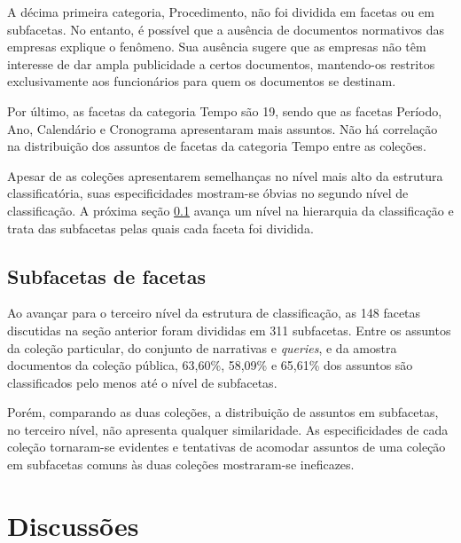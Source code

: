 A décima primeira categoria, Procedimento, não foi dividida em facetas ou em subfacetas. No entanto, é possível que a ausência de documentos normativos das empresas explique o fenômeno. Sua ausência sugere que as empresas não têm interesse de dar ampla publicidade a certos documentos, mantendo-os restritos exclusivamente aos funcionários para quem os documentos se destinam.

Por último, as facetas da categoria Tempo são 19, sendo que as facetas Período, Ano, Calendário e Cronograma apresentaram mais assuntos. Não há correlação na distribuição dos assuntos de facetas da categoria Tempo entre as coleções.

Apesar de as coleções apresentarem semelhanças no nível mais alto da estrutura classificatória, suas especificidades mostram-se óbvias no segundo nível de classificação. A próxima seção \ref{avaliacao-subfacetas} avança um nível na hierarquia da classificação e trata das subfacetas pelas quais cada faceta foi dividida.




\subsection{Subfacetas de facetas}
\label{avaliacao-subfacetas}

Ao avançar para o terceiro nível da estrutura de classificação, as 148 facetas discutidas na seção anterior foram divididas em 311 subfacetas. Entre os assuntos da coleção particular, do conjunto de narrativas e \textit{queries}, e da amostra documentos da coleção pública, 63,60\%, 58,09\% e 65,61\% dos assuntos são classificados pelo menos até o nível de subfacetas.

Porém, comparando as duas coleções, a distribuição de assuntos em subfacetas, no terceiro nível, não apresenta qualquer similaridade. As especificidades de cada coleção tornaram-se evidentes e tentativas de acomodar assuntos de uma coleção em subfacetas comuns às duas coleções mostraram-se ineficazes.


\section{Discussões}

